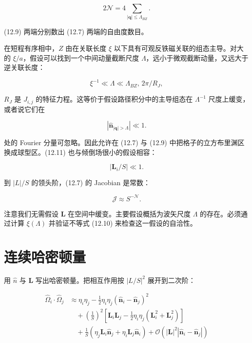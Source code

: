 \begin{equation*}
2 \mathcal {N} = 4 \sum_{| \mathbf {q} | \leq \Lambda_{BZ}} .
\tag{12.9}
\end{equation*}

(12.9) 两端分别数出 (12.7) 两端的自由度数目。

在短程有序相中，$Z$ 由在关联长度 $\xi$ 以下具有可观反铁磁关联的组态主导。对大的 $\xi/a$，假设可以找到一个中间动量截断尺度 $\Lambda$，远小于微观截断动量，又远大于逆关联长度：

\begin{equation*}
\xi^ {- 1} \ll \Lambda \ll \Lambda_{BZ}, \, 2 \pi / R _ {J} ,
\tag{12.10}
\end{equation*}

$R_{J}$ 是 $J_{i,j}$ 的特征力程。这等价于假设路径积分中的主导组态在 $\Lambda^{-1}$ 尺度上缓变，或者说它们在

\begin{equation*}
\left| \hat {\mathbf {n}}_{| \mathbf {q} | > \Lambda} \right| \ll 1.
\tag{12.11}
\end{equation*}

处的 Fourier 分量可忽略。因此允许在 (12.7) 与 (12.9) 中把格子的立方布里渊区换成球型区。(12.11) 也与倾倒场很小的假设相容：

\begin{equation*}
\left| \mathbf {L} _ {i} / S \right| \ll 1.
\tag{12.12}
\end{equation*}

到 $|L|/S$ 的领头阶，(12.7) 的 Jacobian 是常数：

\begin{equation*}
\mathcal {J} \approx S ^ {- \mathcal {N}}.
\tag{12.13}
\end{equation*}

注意我们无需假设 $\mathbf{L}$ 在空间中缓变。主要假设概括为波矢尺度 $\Lambda$ 的存在。必须通过计算 $\xi(\Lambda)$ 并验证不等式 (12.10) 来检查这一假设的自洽性。

\section{连续哈密顿量}

用 $\hat{n}$ 与 $\mathbf{L}$ 写出哈密顿量。把相互作用按 $|L/S|^{2}$ 展开到二次阶：

\begin{align*}
\hat {\Omega} _ {i} \cdot \hat {\Omega} _ {j} & \approx \eta_ {i} \eta_ {j} - \frac {1}{2} \eta_ {i} \eta_ {j} \left( \hat {\mathbf {n}} _ {i} - \hat {\mathbf {n}} _ {j} \right) ^ {2}\\
& \quad + \left( \frac {1}{S} \right) ^ {2} \left[ \mathbf {L} _ {i} \mathbf {L} _ {j} - \frac {1}{2} \eta_ {i} \eta_ {j} \left( \mathbf {L} _ {i} ^ {2} + \mathbf {L} _ {j} ^ {2} \right) \right]\\
& \quad + \frac {1}{S} \left( \eta_ {j} \mathbf {L} _ {i} \hat {\mathbf {n}} _ {j} + \eta_ {i} \mathbf {L} _ {j} \hat {\mathbf {n}} _ {i} \right) + \mathcal {O} \left( | \mathbf {L} | ^ {2} | \hat {\mathbf {n}} _ {i} - \hat {\mathbf {n}} _ {j} | \right)
\tag{12.14}
\end{align*}

